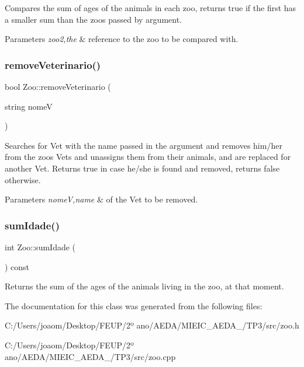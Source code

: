 Compares the sum of ages of the animals in each zoo, returns true if the first has a smaller sum than the zoo\textquotesingle{}s passed by argument. 
\begin{DoxyParams}{Parameters}
{\em zoo2,the} & reference to the zoo to be compared with. \\
\hline
\end{DoxyParams}
\mbox{\label{class_zoo_adfa0c404d6e18e9576524d42f835aea6}} 
\subsubsection{\texorpdfstring{remove\+Veterinario()}{removeVeterinario()}}
{\footnotesize\ttfamily bool Zoo\+::remove\+Veterinario (\begin{DoxyParamCaption}\item[{string}]{nomeV }\end{DoxyParamCaption})}

Searches for Vet with the name passed in the argument and removes him/her from the zoo\textquotesingle{}s Vets and unassigns them from their animals, and are replaced for another Vet. Returns true in case he/she is found and removed, returns false otherwise. 
\begin{DoxyParams}{Parameters}
{\em nomeV,name} & of the Vet to be removed. \\
\hline
\end{DoxyParams}
\mbox{\label{class_zoo_ab96552c5262173467c7eaf5d7908c18e}} 
\subsubsection{\texorpdfstring{sum\+Idade()}{sumIdade()}}
{\footnotesize\ttfamily int Zoo\+::sum\+Idade (\begin{DoxyParamCaption}{ }\end{DoxyParamCaption}) const}

Returns the sum of the ages of the animals living in the zoo, at that moment. 

The documentation for this class was generated from the following files\+:\begin{DoxyCompactItemize}
\item 
C\+:/\+Users/joaom/\+Desktop/\+F\+E\+U\+P/2º ano/\+A\+E\+D\+A/\+M\+I\+E\+I\+C\+\_\+\+A\+E\+D\+A\+\_/\+T\+P3/src/zoo.\+h\item 
C\+:/\+Users/joaom/\+Desktop/\+F\+E\+U\+P/2º ano/\+A\+E\+D\+A/\+M\+I\+E\+I\+C\+\_\+\+A\+E\+D\+A\+\_/\+T\+P3/src/zoo.\+cpp\end{DoxyCompactItemize}
